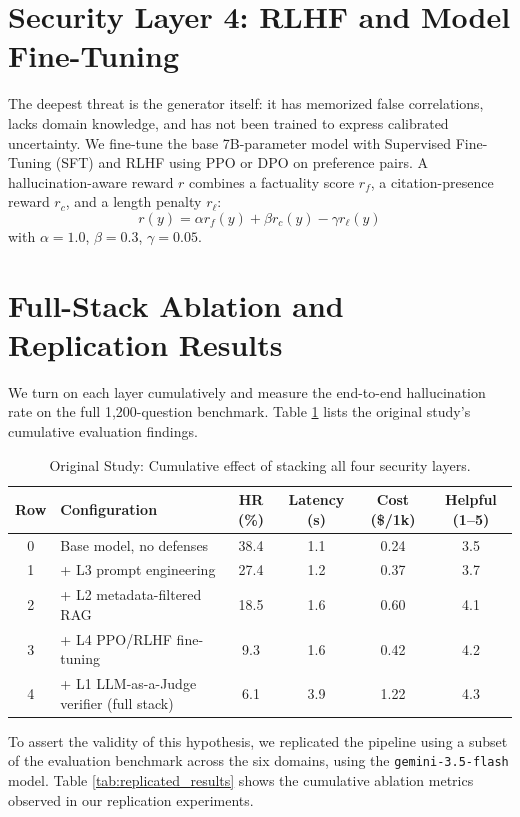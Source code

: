 \documentclass[11pt,a4paper]{article}
\begin{document}
\section{Security Layer 4: RLHF and Model Fine-Tuning}
The deepest threat is the generator itself: it has memorized false correlations, lacks domain knowledge, and has not been trained to express calibrated uncertainty. We fine-tune the base 7B-parameter model with Supervised Fine-Tuning (SFT) and RLHF using PPO \cite{16} or DPO \cite{17} on preference pairs. A hallucination-aware reward $r$ combines a factuality score $r_f$, a citation-presence reward $r_c$, and a length penalty $r_\ell$:
\begin{equation}
r(y) = \alpha r_f(y) + \beta r_c(y) - \gamma r_\ell(y)
\end{equation}
with $\alpha = 1.0$, $\beta = 0.3$, $\gamma = 0.05$.

\section{Full-Stack Ablation and Replication Results}
We turn on each layer cumulatively and measure the end-to-end hallucination rate on the full 1,200-question benchmark. Table \ref{tab:original_ablation} lists the original study's cumulative evaluation findings.

\begin{table}[ht]
\centering
\caption{Original Study: Cumulative effect of stacking all four security layers.}
\label{tab:original_ablation}
\begin{tabular}{clcccc}
\hline
\textbf{Row} & \textbf{Configuration} & \textbf{HR (\%)} & \textbf{Latency (s)} & \textbf{Cost (\$/1k)} & \textbf{Helpful (1--5)} \\ \hline
0 & Base model, no defenses & 38.4 & 1.1 & 0.24 & 3.5 \\
1 & + L3 prompt engineering & 27.4 & 1.2 & 0.37 & 3.7 \\
2 & + L2 metadata-filtered RAG & 18.5 & 1.6 & 0.60 & 4.1 \\
3 & + L4 PPO/RLHF fine-tuning & 9.3 & 1.6 & 0.42 & 4.2 \\
4 & + L1 LLM-as-a-Judge verifier (full stack) & 6.1 & 3.9 & 1.22 & 4.3 \\ \hline
\end{tabular}
\end{table}

To assert the validity of this hypothesis, we replicated the pipeline using a subset of the evaluation benchmark across the six domains, using the \texttt{gemini-3.5-flash} model. Table \ref{tab:replicated_results} shows the cumulative ablation metrics observed in our replication experiments.
\end{document}

